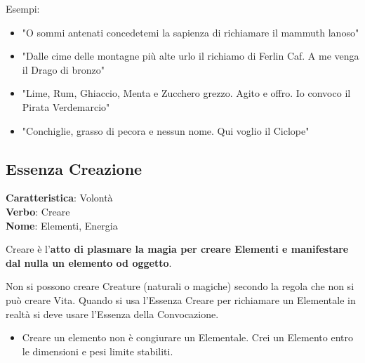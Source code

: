 \documentclass[a4paper,11pt,twoside,openany]{book}
\begin{document}
\bigskip

Esempi:
\begin{itemize}
	\item
	      "O sommi antenati concedetemi la sapienza di richiamare il mammuth lanoso"
	\item
	      "Dalle cime delle montagne più alte urlo il richiamo di Ferlin Caf. A me venga il Drago di bronzo"
	\item
	      "Lime, Rum, Ghiaccio, Menta e Zucchero grezzo. Agito e offro. Io convoco il Pirata Verdemarcio"
	\item
	      "Conchiglie, grasso di pecora e nessun nome. Qui voglio il Ciclope"
\end{itemize}

\pagebreak

\subsection{Essenza Creazione}

\textbf{Caratteristica}: Volontà\\
\textbf{Verbo}: Creare\\
\textbf{Nome}: Elementi, Energia\\


\label{essenza-creazione---volonta}

Creare è l'\textbf{atto di plasmare la magia per creare Elementi e manifestare dal nulla un elemento od oggetto}.

Non si possono creare Creature (naturali o magiche) secondo la regola che non si può creare Vita. Quando si usa l'Essenza Creare per richiamare un Elementale in realtà si deve usare l'Essenza della Convocazione.

\begin{itemize}
	\item Creare un elemento non è congiurare un Elementale. Crei un Elemento entro le dimensioni e pesi limite stabiliti.
\end{itemize}
\end{document}
